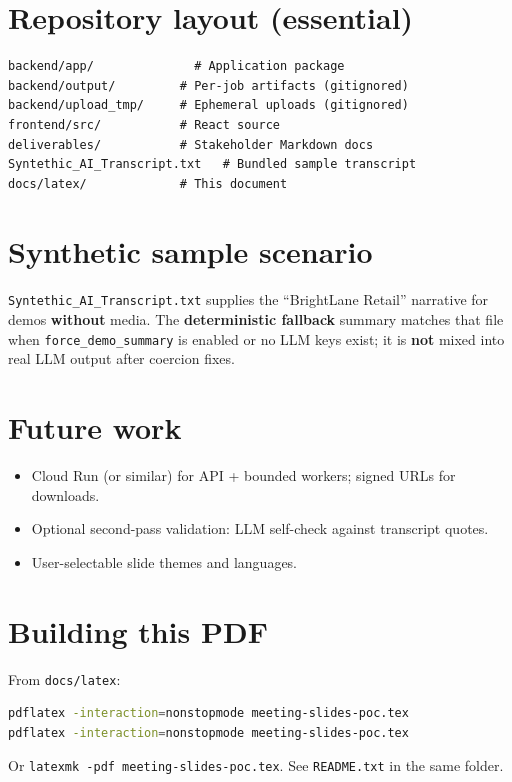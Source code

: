 \documentclass[11pt,a4paper]{article}
\begin{document}
\section{Repository layout (essential)}

\begin{lstlisting}
backend/app/              # Application package
backend/output/         # Per-job artifacts (gitignored)
backend/upload_tmp/     # Ephemeral uploads (gitignored)
frontend/src/           # React source
deliverables/           # Stakeholder Markdown docs
Syntethic_AI_Transcript.txt   # Bundled sample transcript
docs/latex/             # This document
\end{lstlisting}

\section{Synthetic sample scenario}

\texttt{Syntethic\_AI\_Transcript.txt} supplies the ``BrightLane Retail'' narrative for demos \textbf{without} media. The \textbf{deterministic fallback} summary matches that file when \texttt{force\_demo\_summary} is enabled or no LLM keys exist; it is \textbf{not} mixed into real LLM output after coercion fixes.

\section{Future work}

\begin{itemize}
  \item Cloud Run (or similar) for API + bounded workers; signed URLs for downloads.
  \item Optional second-pass validation: LLM self-check against transcript quotes.
  \item User-selectable slide themes and languages.
\end{itemize}

\section{Building this PDF}

From \texttt{docs/latex}:
\begin{lstlisting}[language=bash]
pdflatex -interaction=nonstopmode meeting-slides-poc.tex
pdflatex -interaction=nonstopmode meeting-slides-poc.tex
\end{lstlisting}
Or \texttt{latexmk -pdf meeting-slides-poc.tex}. See \texttt{README.txt} in the same folder.
\end{document}
